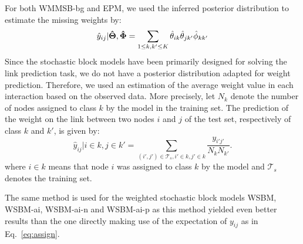 For both WMMSB-bg and EPM, we used the inferred posterior distribution to estimate the missing weights by:
%
\begin{equation}\label{eq:assign}
\hat y_{ij} | \boldsymbol{\hat\Theta}, \boldsymbol{\hat\Phi} = \sum_{1 \le k,k' \le K} \hat\theta_{ik} \hat\theta_{jk'} \hat\phi_{kk'}
\end{equation}
%
%
Since the stochastic block models have been primarily designed for solving the link prediction task, we do not have a posterior distribution adapted for weight prediction. Therefore, we used an estimation of the average weight value in each interaction based on the observed data. More precisely, let $N_k$ denote the number of nodes assigned to class $k$ by the model in the training set. The prediction of the weight on the link between two nodes $i$ and $j$ of the test set, respectively of class $k$ and $k'$, is given by:
%
\[
\hat y_{ij} | i \in k, j \in k' = \sum_{(i',j') \in \mathcal{T}_s, i' \in k, j' \in k} \frac{y_{i'j'}}{N_k N_{k'}}.
\]
%
where $i \in k$ means that node $i$ was assigned to class $k$ by the model and $\mathcal{T}_s$ denotes the training set.
 
The same method is used for the weighted stochastic block models WSBM, WSBM-ai, WSBM-ai-n and WSBM-ai-p as this method yielded even better results than the one directly making use of the expectation of $y_{ij}$ as in Eq.~\ref{eq:assign}.

\begin{table*}[t]
\centering
	
\label{table:mse}
\end{table*}

\begin{figure*}[ht]
\centering
	
   \label{fig:k_evolv}
\end{figure*}

